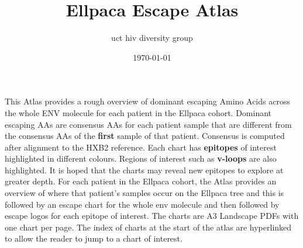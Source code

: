 \documentclass{article}
\title{Ellpaca Escape Atlas}
\author{uct hiv diversity group}
\date{\today}
\begin{document}
\setlength{\parindent}{0pt}

\thispagestyle{empty}
\begin{titlepage}
    \vspace*{5cm}
    \vspace{8cm}
    \vspace{3cm}
\end{titlepage}

\vspace{2cm}
\vspace{2cm}
\setlength{\columnsep}{2cm}
\begin{multicols}{2}
{\fontsize{24}{26}\selectfont
This Atlas provides a rough overview of dominant escaping Amino Acids
across the whole ENV molecule for each patient in the Ellpaca cohort.
Dominant escaping AAs are consensus AAs for each patient sample that 
are different from the consensus AAs of the {\bf first} sample of that patient.
Consensus is computed after alignment to the HXB2 reference. 
Each chart has {\bf epitopes} of interest highlighted in different colours. 
Regions of interest such as {\bf v-loops} are also highlighted. 
It is hoped that the charts may reveal new epitopes to explore at greater depth.
\vfill\null
\columnbreak
For each patient in the Ellpaca cohort, the Atlas provides an overview of
where that patient's samples occur on the Ellpaca tree and this is followed
by an escape chart for the whole env molecule and then followed by 
escape logos for each epitope of interest. The charts are A3 Landscape PDFs 
with one chart per page. The index of charts at the start of the atlas are 
hyperlinked to allow the reader to jump to a chart of interest.
\vfill\null
}
\end{multicols}
\newpage

\vspace{2cm}
\vspace{2cm}
\setlength{\columnsep}{2cm}
\begin{multicols*}{6}
{\fontsize{18}{18}\selectfont

}
\end{multicols*}
\restoregeometry
\end{document}
